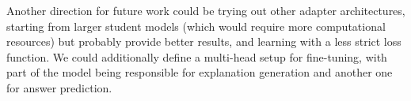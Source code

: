 \documentclass{article}
\begin{document}
Another direction for future work could be trying out other adapter architectures, starting from larger student models (which would require more computational resources) but probably provide better results, and learning with a less strict loss function.
\newline
We could additionally define a multi-head setup for fine-tuning, with part of the model being responsible for explanation generation and another one for answer prediction.



\newpage
\newpage


\end{document}
